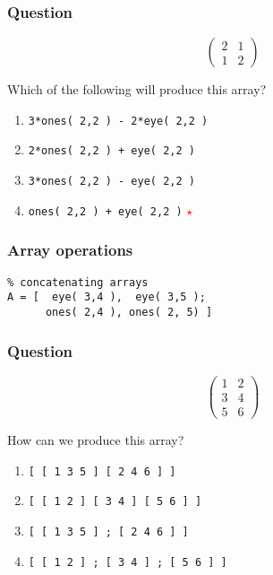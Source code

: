 \documentclass[11pt]{beamer}
\newcommand{\correctstar}{{\Large\textcolor{red}{$\star$}}}
\begin{document}
\begin{frame}[fragile]
  \frametitle{Question}
  \Enlarge
$$
\left(
\begin{array}{cc}
2 & 1 \\
1 & 2
\end{array}
\right)
$$

Which of the following will produce this array?

  \begin{enumerate}[label=\Alph*]
    \item  \texttt{3*ones( 2,2 ) - 2*eye( 2,2 )}
    \item  \texttt{2*ones( 2,2 ) + eye( 2,2 )}
    \item  \texttt{3*ones( 2,2 ) - eye( 2,2 )}
    \item  \texttt{ones( 2,2 ) + eye( 2,2 )}  \correctstar
  \end{enumerate}
\end{frame}

\begin{frame}[fragile]
  \frametitle{Array operations}
  \Enlarge

  \begin{Verbatim}
% concatenating arrays
A = [  eye( 3,4 ),  eye( 3,5 );
      ones( 2,4 ), ones( 2, 5) ]
  \end{Verbatim}
\end{frame}

\begin{frame}[fragile]
  \frametitle{Question}
  \Enlarge
$$
\left(
\begin{array}{cc}
1 & 2 \\
3 & 4 \\
5 & 6
\end{array}
\right)
$$

How can we produce this array?

  \begin{enumerate}[label=\Alph*]
    \item  \texttt{[ [ 1 3 5 ] [ 2 4 6 ] ]}
    \item  \texttt{[ [ 1 2 ] [ 3 4 ] [ 5 6 ] ]}
    \item  \texttt{[ [ 1 3 5 ] ; [ 2 4 6 ] ]}
    \item  \texttt{[ [ 1 2 ] ; [ 3 4 ] ; [ 5 6 ] ]}
  \end{enumerate}
\end{frame}
\end{document}
